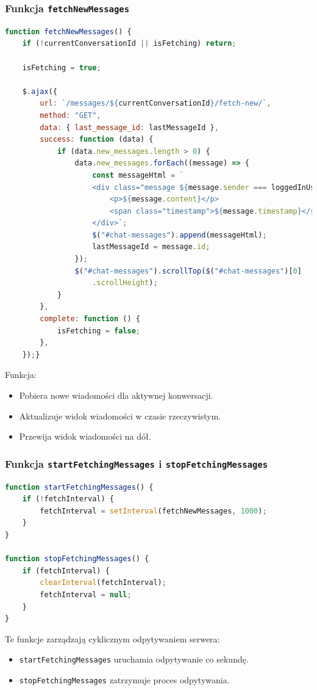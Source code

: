 \documentclass[12pt,a4paper,oneside]{article}
\theoremstyle{definition}
\numberwithin{equation}{section}
\begin{document}
\subsubsection*{Funkcja \texttt{fetchNewMessages}}
\begin{lstlisting}[language=JavaScript, caption=Funkcja \texttt{fetchNewMessages}]
function fetchNewMessages() {
    if (!currentConversationId || isFetching) return;

    isFetching = true;

    $.ajax({
        url: `/messages/${currentConversationId}/fetch-new/`,
        method: "GET",
        data: { last_message_id: lastMessageId },
        success: function (data) {
            if (data.new_messages.length > 0) {
                data.new_messages.forEach((message) => {
                    const messageHtml = `
                    <div class="message ${message.sender === loggedInUser ? "message-sent" : "message-received"}">
                        <p>${message.content}</p>
                        <span class="timestamp">${message.timestamp}</span>
                    </div>`;
                    $("#chat-messages").append(messageHtml);
                    lastMessageId = message.id;
                });
                $("#chat-messages").scrollTop($("#chat-messages")[0]
                    .scrollHeight);
            }
        },
        complete: function () {
            isFetching = false;
        },
    });}
\end{lstlisting}
Funkcja:
\begin{itemize}
    \item Pobiera nowe wiadomości dla aktywnej konwersacji.
    \item Aktualizuje widok wiadomości w czasie rzeczywistym.
    \item Przewija widok wiadomości na dół.
\end{itemize}



\subsubsection*{Funkcja \texttt{startFetchingMessages} i \texttt{stopFetchingMessages}}
\begin{lstlisting}[language=JavaScript, caption=Funkcje do zarządzania cyklicznym odpytywaniem]
function startFetchingMessages() {
    if (!fetchInterval) {
        fetchInterval = setInterval(fetchNewMessages, 1000);
    }
}

function stopFetchingMessages() {
    if (fetchInterval) {
        clearInterval(fetchInterval);
        fetchInterval = null;
    }
}
\end{lstlisting}
Te funkcje zarządzają cyklicznym odpytywaniem serwera:
\begin{itemize}
    \item \texttt{startFetchingMessages} uruchamia odpytywanie co sekundę.
    \item \texttt{stopFetchingMessages} zatrzymuje proces odpytywania.
\end{itemize}
\end{document}
